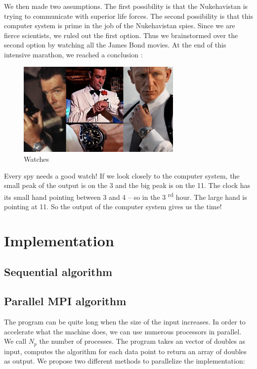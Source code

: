 \documentclass[11pt,a4paper]{article}
\begin{document}
We then made two assumptions. The first possibility is that the Nukehavistan is trying to communicate with superior life forces. The second possibility is that this computer system is prime in the job of the Nukehavistan spies. Since we are fierce scientists, we ruled out the first option. Thus we brainstormed over the second option by watching all the James Bond movies. At the end of this intensive marathon, we reached a conclusion :

\begin{figure}[!h]
\centering
\includegraphics[width=8cm]{watches.png}
\caption{Watches}
\label{reverse}
\end{figure}

Every spy needs a good watch! If we look closely to the computer system, the small peak of the output is on the 3 and the big peak is on the 11. The clock has its small hand pointing between 3 and 4 -- so in the 3 \textsuperscript{rd} hour. The large hand is pointing at 11. So the output of the computer system gives us the time!

\section{Implementation}

\subsection{Sequential algorithm}

\subsection{Parallel MPI algorithm}

The program can be quite long when the size of the input increases. In order to accelerate what the machine does, we can use numerous processors in parallel. We call $N_p$ the number of processes. The program takes an vector of doubles as input, computes the algorithm for each data point to return an array of doubles as output. We propose two different methods to parallelize the implementation:
\end{document}

